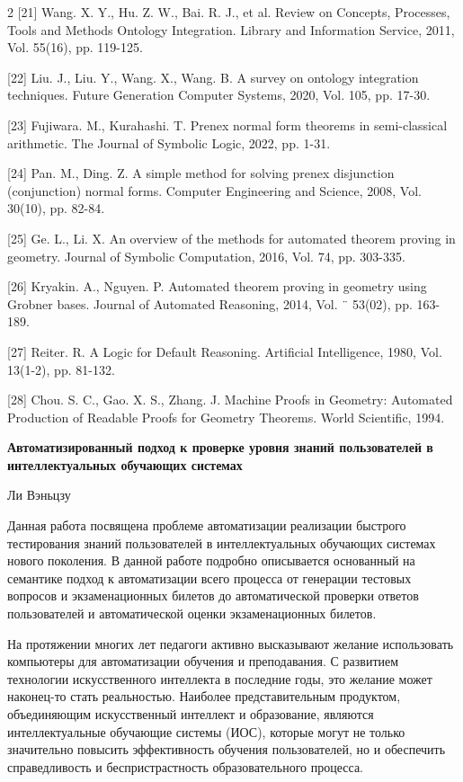 \documentclass{article}
\begin{document}
\begin{multicols}{2}
[21] Wang. X. Y., Hu. Z. W., Bai. R. J., et al. Review on Concepts, Processes, Tools and Methods Ontology Integration. Library and Information Service, 2011, Vol. 55(16), pp. 119-125.

[22] Liu. J., Liu. Y., Wang. X., Wang. B. A survey on ontology integration techniques. Future Generation Computer Systems, 2020, Vol. 105, pp. 17-30.

[23] Fujiwara. M., Kurahashi. T. Prenex normal form theorems in semi-classical arithmetic. The Journal of Symbolic Logic, 2022, pp. 1-31.

[24] Pan. M., Ding. Z. A simple method for solving prenex disjunction (conjunction) normal forms. Computer Engineering and Science, 2008, Vol. 30(10), pp. 82-84.

[25] Ge. L., Li. X. An overview of the methods for automated theorem proving in geometry. Journal of Symbolic Computation, 2016, Vol. 74, pp. 303-335.

[26] Kryakin. A., Nguyen. P. Automated theorem proving in geometry using Grobner bases. Journal of Automated Reasoning, 2014, Vol. ¨ 53(02), pp. 163-189.

[27] Reiter. R. A Logic for Default Reasoning. Artificial Intelligence, 1980, Vol. 13(1-2), pp. 81-132.

[28] Chou. S. C., Gao. X. S., Zhang. J. Machine Proofs in Geometry: Automated Production of Readable Proofs for Geometry Theorems. World Scientific, 1994.

\begin{center}
\fontsize{12}{11}\selectfont
\textbf{Автоматизированный подход к проверке уровня знаний пользователей в интеллектуальных обучающих системах}

\vspace{0.4cm}
Ли Вэньцзу
\end{center}
Данная работа посвящена проблеме автоматизации реализации быстрого тестирования знаний пользователей в интеллектуальных обучающих системах нового поколения. В данной работе подробно описывается основанный на семантике подход к автоматизации всего процесса от генерации тестовых вопросов и экзаменационных билетов до автоматической проверки ответов пользователей и автоматической оценки экзаменационных билетов.

На протяжении многих лет педагоги активно высказывают желание использовать компьютеры для автоматизации обучения и преподавания. С развитием технологии искусственного интеллекта в последние годы, это желание может наконец-то стать реальностью. Наиболее представительным продуктом, объединяющим искусственный интеллект и образование, являются интеллектуальные обучающие системы (ИОС), которые могут не только значительно повысить эффективность обучения пользователей, но и обеспечить справедливость и беспристрастность образовательного процесса. 


\end{multicols}
\end{document}
